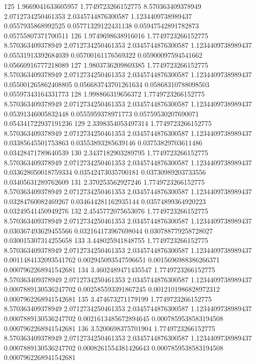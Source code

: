 {125 1.9669041633605957 1.7749723266152775 8.570363409378949 2.0712734250461353 2.0345744876300587 1.1234409738989437 0.0557935868992525 0.05771329122431138 0.05947542891782873 0.05755807371700511
126 1.9749698638916016 1.7749723266152775 8.570363409378949 2.0712734250461353 2.0345744876300587 1.1234409738989437 0.05531913392684039 0.05700161176569322 0.05900097594541662 0.05660916777218089
127 1.9803736209869385 1.7749723266152775 8.570363409378949 2.0712734250461353 2.0345744876300587 1.1234409738989437 0.055001265862408805 0.056683743701261634 0.05868310788098503 0.05597343164331773
128 1.998866319656372 1.7749723266152775 8.570363409378949 2.0712734250461353 2.0345744876300587 1.1234409738989437 0.05391346005832448 0.0555959378971773 0.05759530207690071 0.054341722937191236
129 2.3398354053497314 1.7749723266152775 8.570363409378949 2.0712734250461353 2.0345744876300587 1.1234409738989437 0.03385645501753863 0.03553893285639146 0.03753829703611486 0.03428471789640539
130 2.3437182903289795 1.7749723266152775 8.570363409378949 2.0712734250461353 2.0345744876300587 1.1234409738989437 0.033628050018759334 0.03542473035700181 0.03730989203733556 0.03405631289762609
131 2.370253562927246 1.7749723266152775 8.570363409378949 2.0712734250461353 2.0345744876300587 1.1234409738989437 0.03284760082469267 0.034644281162935144 0.03574899364920223 0.03249541450949276
132 2.4545772075653076 1.7749723266152775 8.570363409378949 2.0712734250461353 2.0345744876300587 1.1234409738989437 0.030367493629455566 0.032164173967698044 0.030788779258728027 0.030015307314255658
133 3.448025941848755 1.7749723266152775 8.570363409378949 2.0712734250461353 2.0345744876300587 1.1234409738989437 0.0011484132093541762 0.002945093547596651 0.0015696988386266371 0.0007962268941542681
134 3.4602489471435547 1.7749723266152775 8.570363409378949 2.0712734250461353 2.0345744876300587 1.1234409738989437 0.0007889130536247702 0.002585593391867245 0.0012101986828972312 0.0007962268941542681
135 3.474673271179199 1.7749723266152775 8.570363409378949 2.0712734250461353 2.0345744876300587 1.1234409738989437 0.0007889130536247702 0.0021613485672894645 0.0007859538583194508 0.0007962268941542681
136 3.5200698375701904 1.7749723266152775 8.570363409378949 2.0712734250461353 2.0345744876300587 1.1234409738989437 0.0007889130536247702 0.0008261554381426643 0.0007859538583194508 0.0007962268941542681
}\tableexpivwaitbetterxb
